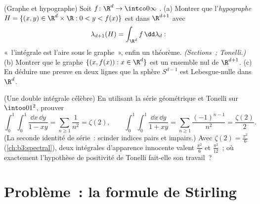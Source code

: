 \begin{exercise}[$\star\star$]\label{exo:b3:product:11}
(Graphe et hypographe) Soit $f \colon \R^d \to \intco0\infty$
.
(a) Montrer que l'\emph{hypographe} $H = \{(x, y) \in
\R^d\times\R : 0 < y < f(x)\}$ est  dans
$\R^{d+1}$ avec
\[
\lambda_{d+1}(H) = \int_{\R^d}f\,\dd\lambda_d :
\]
«~l'intégrale est l'aire sous le graphe~», enfin un théorème.
\emph{(Sections~; Tonelli.)}
(b) Montrer que le graphe $\{(x, f(x)) : x \in \R^d\}$ est un
ensemble nul de $\R^{d+1}$.
(c) En déduire une preuve en deux lignes que la sphère
$S^{d-1}$ est Lebesgue-nulle dans $\R^d$.
\end{exercise}

\begin{exercise}[$\star\star$]\label{exo:b3:product:12}
(Une double intégrale célèbre) En utilisant la série
géométrique et Tonelli sur $\intoo01^2$, prouver
\[
\int_0^1\!\!\int_0^1\frac{\dd x\,\dd y}{1 - xy}
= \sum_{n\geq1}\frac1{n^2} = \zeta(2),
\qquad
\int_0^1\!\!\int_0^1\frac{\dd x\,\dd y}{1 + xy}
= \sum_{n\geq1}\frac{(-1)^{n-1}}{n^2} = \frac{\zeta(2)}2 .
\]
(La seconde identité de série~: scinder indices pairs et
impairs.) Avec $\zeta(2) = \frac{\pi^2}6$
(\cref{ch:b3:spectral}), deux intégrales d'apparence
innocente valent $\frac{\pi^2}6$ et $\frac{\pi^2}{12}$~; où
exactement l'hypothèse de positivité de Tonelli fait-elle son
travail~?
\end{exercise}

\section{Problème~: la formule de Stirling}

